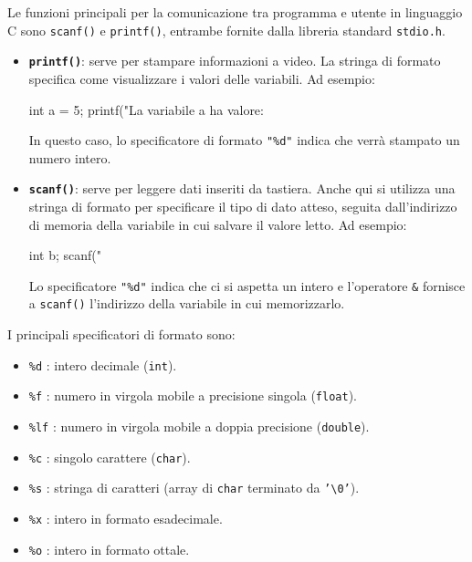 \documentclass[oneside]{scrbook}
\begin{document}
Le funzioni principali per la comunicazione tra programma e utente in linguaggio C
sono \texttt{scanf()} e \texttt{printf()}, entrambe fornite dalla libreria standard
\texttt{stdio.h}.

\begin{itemize}
  \item \textbf{\texttt{printf()}}: serve per stampare informazioni a video.
        La stringa di formato specifica come visualizzare i valori delle variabili.
        Ad esempio:
        \begin{clang}
          int a = 5;
          printf("La variabile a ha valore: %
        \end{clang}
        In questo caso, lo specificatore di formato \texttt{"\%d"} indica che
        verrà stampato un numero intero.

  \item \textbf{\texttt{scanf()}}: serve per leggere dati inseriti da tastiera.
        Anche qui si utilizza una stringa di formato per specificare il tipo di
        dato atteso, seguita dall’indirizzo di memoria della variabile in cui
        salvare il valore letto. Ad esempio:
        \begin{clang}
          int b;
          scanf("%
        \end{clang}
        Lo specificatore \texttt{"\%d"} indica che ci si aspetta un intero e
        l’operatore \texttt{\&} fornisce a \texttt{scanf()} l’indirizzo della
        variabile in cui memorizzarlo.
\end{itemize}

I principali specificatori di formato sono:
\begin{itemize}
  \item \texttt{\%d} : intero decimale (\texttt{int}).
  \item \texttt{\%f} : numero in virgola mobile a precisione singola (\texttt{float}).
  \item \texttt{\%lf} : numero in virgola mobile a doppia precisione (\texttt{double}).
  \item \texttt{\%c} : singolo carattere (\texttt{char}).
  \item \texttt{\%s} : stringa di caratteri (array di \texttt{char} terminato da \texttt{'\textbackslash 0'}).
  \item \texttt{\%x} : intero in formato esadecimale.
  \item \texttt{\%o} : intero in formato ottale.
\end{itemize}
\end{document}
